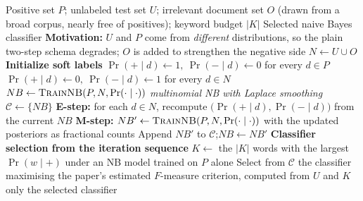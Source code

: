 \documentclass{article}
\begin{document}
\begin{algorithm}[!h]
\renewcommand{\algorithmicrequire}{\textbf{Input:}}
\renewcommand{\algorithmicensure}{\textbf{Output:}}
	\caption{A-EM (augmented EM for PU learning under different data distributions)}
	\begin{algorithmic}[1]
	    \REQUIRE
	    Positive set $P$; unlabeled test set $U$; irrelevant document set $O$
	    (drawn from a broad corpus, nearly free of positives);
	    keyword budget $|K|$
	    \ENSURE
	    Selected naive Bayes classifier
	    \STATE \textbf{Motivation:} $U$ and $P$ come from \emph{different} distributions, so the
	    plain two-step schema degrades; $O$ is added to strengthen the negative side %
	    \STATE $N\leftarrow U\cup O$
	    \STATE \textbf{Initialize soft labels}
	    \STATE $\Pr(+\mid d)\leftarrow 1,\ \Pr(-\mid d)\leftarrow 0$ for every $d\in P$
	    \STATE $\Pr(+\mid d)\leftarrow 0,\ \Pr(-\mid d)\leftarrow 1$ for every $d\in N$
	    \STATE $NB\leftarrow \textsc{TrainNB}(P,N,\Pr(\cdot\mid\cdot))$
	    \hfill \emph{multinomial NB with Laplace smoothing} %
	    \STATE $\mathcal{C}\leftarrow \{NB\}$
	    \REPEAT
	    \STATE \textbf{E-step:} for each $d\in N$, recompute
	    $\big(\Pr(+\mid d),\Pr(-\mid d)\big)$ from the current $NB$
	    \STATE \textbf{M-step:} $NB'\leftarrow \textsc{TrainNB}(P,N,\Pr(\cdot\mid\cdot))$ with the
	    updated posteriors as fractional counts
	    \STATE Append $NB'$ to $\mathcal{C}$;\quad $NB\leftarrow NB'$
	    \STATE \textbf{Classifier selection from the iteration sequence}
	    \STATE $K\leftarrow$ the $|K|$ words with the largest $\Pr(w\mid +)$ under an NB model
	    trained on $P$ alone %
	    \STATE Select from $\mathcal{C}$ the classifier maximising the paper's estimated
	    $F$-measure criterion, computed from $U$ and $K$ only %
		\RETURN the selected classifier
	\end{algorithmic}
\end{algorithm}
%
\end{document}
